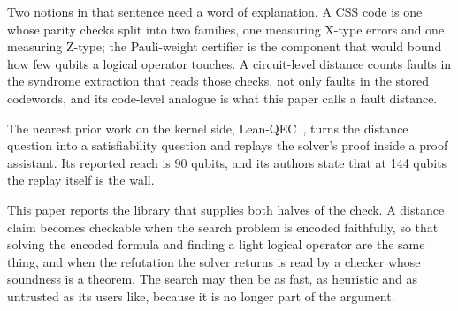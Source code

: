 \documentclass[11pt]{article}
\begin{document}
Two notions in that sentence need a word of explanation. A
CSS code is one whose parity checks split into two families, one measuring X-type errors
and one measuring Z-type; the Pauli-weight certifier is the component that would bound
how few qubits a logical operator touches. A circuit-level distance counts faults in the
syndrome extraction that reads those checks, not only faults in the stored codewords, and
its code-level analogue is what this paper calls a fault distance.

The nearest prior work on the kernel side, Lean-QEC~\cite{leanqec}, turns the distance
question into a satisfiability question and replays the solver's proof inside a proof
assistant. Its reported reach is 90 qubits, and its authors state that at 144 qubits the
replay itself is the wall.

This paper reports the library that supplies both halves of the check. A distance claim
becomes checkable when the search problem is encoded faithfully, so that solving the
encoded formula and finding a light logical operator are the same thing, and when the
refutation the solver returns is read by a checker whose soundness is a theorem. The
search may then be as fast, as heuristic and as untrusted as its users like, because it
is no longer part of the argument.
\end{document}
